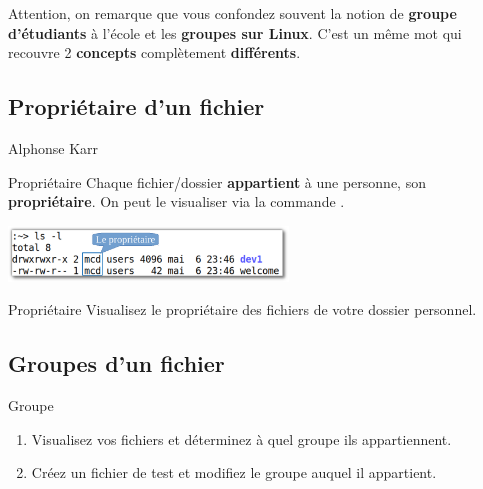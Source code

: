 \documentclass[a4paper,11pt]{style-esi/td}
\begin{document}
		\medskip
		\begin{alertbox}
			Attention, on remarque que vous confondez souvent 
			la notion de \textbf{groupe d'étudiants} à l'école
			et les \textbf{groupes sur Linux}.
			C'est un même mot qui recouvre 2 
			\textbf{concepts} complètement \textbf{différents}.
		\end{alertbox}

	\subsection{Propriétaire d'un fichier}
	
			{Alphonse Karr}
		\vspace{2em}

		\vspace{1em}

		\begin{theorie}{Propriétaire}
			Chaque fichier/dossier \textbf{appartient} à une personne, 
			son \textbf{propriétaire}.
			On peut le visualiser via la commande .
		\end{theorie}

		\begin{center}
			\includegraphics[height=4em]{image/owner}
		\end{center}

		\begin{Exercice}{Propriétaire}
			Visualisez le propriétaire des fichiers de votre dossier personnel.
		\end{Exercice}

	\subsection{Groupes d'un fichier}

	

\begin{Tutoriel}{Groupe}	
%
\begin{enumerate}
	
	\item Visualisez vos fichiers et déterminez à quel groupe ils appartiennent.
	\item Créez un fichier de test et modifiez le groupe auquel il appartient.
\end{enumerate}
		\end{Tutoriel}
\end{document}
